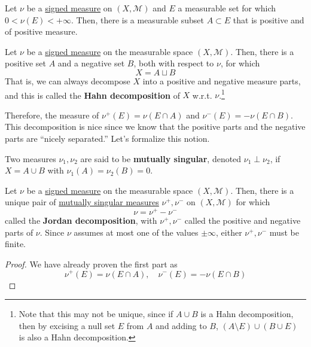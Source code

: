   \begin{lemma}
    \label{thm:hahns-lemma}
    Let $\nu$ be a \hyperref[def:signed-measure]{signed measure} on $(X, \mathcal{M})$ and $E$ a measurable set for which $0 < \nu(E) < +\infty$. Then, there is a measurable subset $A \subset E$ that is positive and of positive measure. 
  \end{lemma}

  \begin{theorem}
    \label{thm:hahn-decomposition-theorem}
    Let $\nu$ be a \hyperref[def:signed-measure]{signed measure} on the measurable space $(X, \mathcal{M})$. Then, there is a positive set $A$ and a negative set $B$, both with respect to $\nu$, for which 
    \begin{equation}
      X = A \sqcup B
    \end{equation}
    That is, we can always decompose $X$ into a positive and negative measure parts, and this is called the \textbf{Hahn decomposition} of $X$ w.r.t. $\nu$.\footnote{Note that this may not be unique, since if $A \cup B$ is a Hahn decomposition, then by excising a null set $E$ from $A$ and adding to $B$, $(A \setminus E) \cup (B \cup E)$ is also a Hahn decomposition.} 
  \end{theorem}

  Therefore, the measure of $\nu^+ (E) = \nu (E \cap A)$ and $\nu^- (E) = -\nu(E \cap B)$. This decomposition is nice since we know that the positive parts and the negative parts are ``nicely separated.'' Let's formalize this notion. 

  \begin{definition}
    \label{def:mutually-singular-measures}
    Two measures $\nu_1, \nu_2$ are said to be \textbf{mutually singular}, denoted $\nu_1 \perp \nu_2$, if $X = A \cup B$ with $\nu_1 (A) = \nu_2 (B) = 0$. 
  \end{definition}

  \begin{theorem}
    \label{thm:jordan-decomposition-theorem}
    Let $\nu$ be a \hyperref[def:signed-measure]{signed measure} on the measurable space $(X, \mathcal{M})$. Then, there is a unique pair of \hyperref[def:mutually-singular-measures]{mutually singular measures} $\nu^+, \nu^-$ on $(X, \mathcal{M})$ for which 
    \begin{equation}
      \nu = \nu^+ - \nu^- 
    \end{equation}
    called the \textbf{Jordan decomposition}, with $\nu^+, \nu^-$ called the positive and negative parts of $\nu$. Since $\nu$ assumes at most one of the values $\pm \infty$, either $\nu^+, \nu^-$ must be finite. 
  \end{theorem}
  \begin{proof}
    We have already proven the first part as 
    \begin{equation}
      \nu^+ (E) = \nu (E \cap A), \quad \nu^- (E) = -\nu(E \cap B)
    \end{equation}
  \end{proof}

